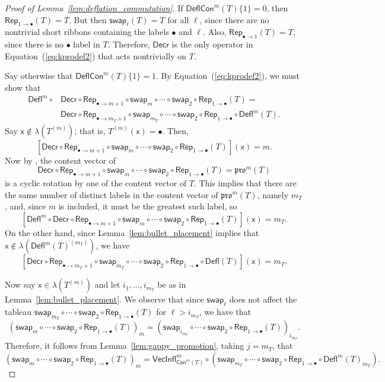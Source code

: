 \documentclass[12pt]{amsart}
\newcommand{\x}{\ensuremath{\mathsf{x}}}
\theoremstyle{definition}
\theoremstyle{remark}
\numberwithin{equation}{section}
\newcommand{\pro}{\mathfrak{pro}}
\newcommand{\swap}{\ensuremath{\mathsf{swap}}}
\newcommand{\decr}{\ensuremath{\mathsf{Decr}}}
\newcommand{\rep}{\ensuremath{\mathsf{Rep}}}
\newcommand{\deflate}{\ensuremath{\mathsf{Defl}}}
\newcommand{\inflate}{\ensuremath{\mathsf{VecInfl}}}
\newcommand{\content}{\ensuremath{\mathsf{Con}}}
\newcommand{\compress}{\ensuremath{\mathsf{DeflCon}}}
\begin{document}
\begin{proof}[Proof of Lemma~\ref{lem:deflation_commutation}]
If $\compress^m(T)\lbrace 1 \rbrace = 0$, then $\rep_{1 \rightarrow \bullet}(T) = T$. But then $\swap_\ell(T) = T$ for all $\ell$, since there are no nontrivial short ribbons containing the labels $\bullet$ and $\ell$. Also, $\rep_{\bullet \rightarrow 1}(T) = T$, since there is no $\bullet$ label in $T$. Therefore, $\decr$ is the only operator in Equation~(\ref{eq:kprodef2}) that acts nontrivially on $T$. 


Say otherwise that $\compress^m(T)\lbrace 1 \rbrace = 1$. By Equation~(\ref{eq:kprodef2}), we must show that
\begin{align*}
\deflate^m \circ &\decr \circ \rep_{\bullet \rightarrow m+1} \circ \swap_m \circ \cdots \circ \swap_2\circ \rep_{1 \rightarrow \bullet} (T) = \\
 & \decr \circ \rep_{\bullet \rightarrow m_T+1} \circ \swap_{m_T} \circ \cdots \circ \swap_2 \circ \rep_{1 \rightarrow \bullet} \circ \deflate^m (T). 
\end{align*}
Say $\x \not \in \lambda(T^{(m)})$; that is,  $T^{(m)}(\x) = \bullet$.  Then,
\[
[\decr \circ \rep_{\bullet \rightarrow m+1} \circ \swap_m \circ \cdots \circ \swap_2 \circ \rep_{1 \rightarrow \bullet} (T)](\x) = m.
\]
Now by \cite[Lemma~2.1]{DPS}, the content vector of  
\[
\decr \circ \rep_{\bullet \rightarrow m+1} \circ \swap_m \circ \cdots \circ \swap_2 \circ \rep_{1 \rightarrow \bullet} (T) = \pro^m(T)
\]
 is a cyclic rotation by one of the content vector of $T$. This implies that there are the same number of distinct labels in the content vector of $\pro^m(T)$, namely $m_T$, and, since $m$ is included, it must be the greatest such label, so 
 \[
 [\deflate^m \circ \decr \circ \rep_{\bullet \rightarrow m+1} \circ \swap_m \circ \cdots \circ \swap_2 \circ \rep_{1 \rightarrow \bullet} (T)](\x) = m_T.
 \]
  On the other hand, since Lemma~\ref{lem:bullet_placement} implies that $\x \not \in \lambda(\deflate^m(T)^{(m_T)})$, we have
  \[
  [\decr \circ \rep_{\bullet \rightarrow m_T + 1} \circ \swap_{m_T} \circ \cdots \circ \swap_2 \circ \rep_{1 \rightarrow \bullet} \circ \deflate(T)](\x) = m_T.
  \] 

Now say $\x \in \lambda(T^{(m)})$ and let $i_1, \ldots, i_{m_T}$ be as in Lemma~\ref{lem:bullet_placement}. We observe that since $\swap_\ell$ does not affect the tableau $\swap_{m_T} \circ \cdots \circ \swap_2 \circ \rep_{1 \rightarrow \bullet} (T)$ for $\ell > i_{m_T}$, we have that
\[ (\swap_m \circ \cdots \circ \swap_2 \circ \rep_{1 \rightarrow \bullet}( T ))_m = (\swap_{i_{m_T}} \circ \cdots \circ \swap_2 \circ \rep_{1 \rightarrow \bullet}( T ))_{i_{m_T}}.  \]
Therefore, it follows from Lemma~\ref{lem:gappy_promotion}, taking $j = m_T$, that 
\[ (\swap_m \circ \cdots \circ \swap_2 \circ \rep_{1 \rightarrow \bullet}( T ))_m = \inflate^m_{\content^m(T)} \circ (\swap_{m_T} \circ \cdots \circ   \swap_2  \circ \rep_{1 \rightarrow \bullet} \circ \deflate^m(T)_{m_T}). \]


\end{proof}
\end{document}
